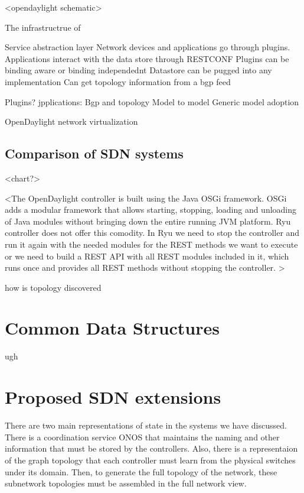 \documentclass[letterpaper,twocolumn,10pt]{article}
\begin{document}
<opendaylight schematic>

The infrastructrue of 


Service abstraction layer
Network devices and applications go through plugins. Applications interact with the data store through RESTCONF
Plugins can be binding aware or binding independednt 
Datastore can be pugged into any implementation
Can get topology information from a bgp feed



Plugins?
jpplications:
	Bgp and topology
	Model to model
	Generic model adoption






OpenDaylight network virtualization

\cite{ODL}

\subsection {Comparison of SDN systems}

<chart?>

<The OpenDaylight controller is built using the Java OSGi framework. OSGi adds a modular framework that allows starting, stopping, loading and unloading of Java modules without bringing down the entire running JVM platform. Ryu controller does not offer this comodity. In Ryu we need to stop the controller and run it again with the needed modules for the REST methods we want to execute or we need to build a REST API with all REST modules included in it, which runs once and provides all REST methods without stopping the controller. >

how is topology discovered


\section{Common Data Structures}

ugh

\section{Proposed SDN extensions}

There are two main representations of state in the systems we have discussed. There is a coordination service ONOS that maintains the naming and other information that must be stored by the controllers. Also, there is a representaion of the graph topology that each controller must learn from the physical switches under its domain. Then, to generate the full topology of the network, these subnetwork topologies must be assembled in the full network view.
\end{document}

